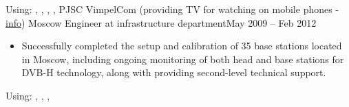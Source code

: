 Using: , , , , 
\horizontalline
% 
\ressubheading
{PJSC VimpelCom}
{(providing TV for watching on mobile phones - \href{https://www.dvb.org/news/russia-to-launch-dvb-h-services}{info})}
{Moscow}
{Engineer at infrastructure department}{May 2009 -- Feb 2012}
\begin{itemize}
    \item Successfully completed the setup and calibration of 35 base stations located in Moscow, including ongoing monitoring of both head and base stations for DVB-H technology, along with providing second-level technical support.
\end{itemize}
Using: , , , 


